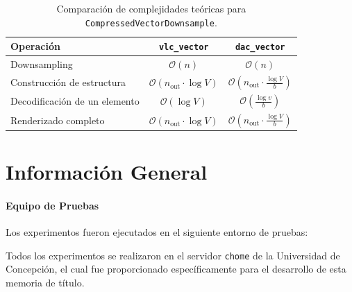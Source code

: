 \begin{table}[H]
\centering
\caption{Comparación de complejidades teóricas para \texttt{CompressedVectorDownsample}.}
\label{tabla:complejidades_vectores}
\begin{tabular}{@{}lcc@{}}
\toprule
\textbf{Operación} & \textbf{\texttt{vlc\_vector}} & \textbf{\texttt{dac\_vector}} \\
\midrule
Downsampling                           & $\mathcal{O}(n)$                                     & $\mathcal{O}(n)$ \\[0.5em]
Construcción de estructura             & $\mathcal{O}(n_{\text{out}} \cdot \log V)$           & $\mathcal{O}(n_{\text{out}} \cdot \frac{\log V}{b})$ \\[0.5em]
Decodificación de un elemento          & $\mathcal{O}(\log V)$                                & $\mathcal{O}(\frac{\log v}{b})$ \\[0.5em]
Renderizado completo                   & $\mathcal{O}(n_{\text{out}} \cdot \log V)$           & $\mathcal{O}(n_{\text{out}} \cdot \frac{\log V}{b})$ \\[0.5em]
\bottomrule
\end{tabular}
\end{table}

\newpage
\section{Información General}
\label{general_info}

\paragraph{Equipo de Pruebas}
Los experimentos fueron ejecutados en el siguiente entorno de pruebas:

Todos los experimentos se realizaron en el servidor \texttt{chome} de la Universidad de Concepción, el cual fue proporcionado específicamente para el desarrollo de esta memoria de título. 

